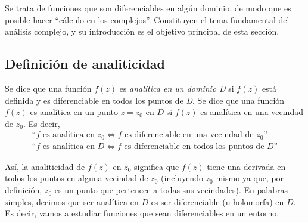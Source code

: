 Se trata de funciones que son diferenciables en algún dominio, de modo que es posible hacer ``cálculo en los complejos''. Constituyen el tema fundamental del análisis complejo, y su introducción es el objetivo principal de esta sección. 

\subsection{Definición de analiticidad}

Se dice que una función $f(z)$ es \textit{analítica en un dominio D} si $f(z)$ está definida y es diferenciable en todos los puntos de \textit{D}. Se dice que una función $f(z)$ es analítica en un punto $z=z_0$ en $D$ si $f(z)$ es analítica en una vecindad de $z_0$. Es decir, 
\begin{gather*}
  \text{``}f \text{ es analítica en }z_0 \Leftrightarrow f \text{ es diferenciable en una vecindad de }z_0\text{''} \\ 
  \text{``}f \text{ es analítica en }D \Leftrightarrow f \text{ es diferenciable en todos los puntos de }D\text{''}
\end{gather*}

Así, la analiticidad de $f(z)$ en $z_0$ significa que $f(z)$ tiene una derivada en todos los puntos en alguna vecindad de $z_0$ (incluyendo $z_0$ mismo ya que, por definición, $z_0$ es un punto que pertenece a todas sus vecindades). En palabras simples, decimos que ser analítica en $D$ es ser diferenciable (u holomorfa) en $D$. Es decir, vamos a estudiar funciones que sean diferenciables en un entorno.

